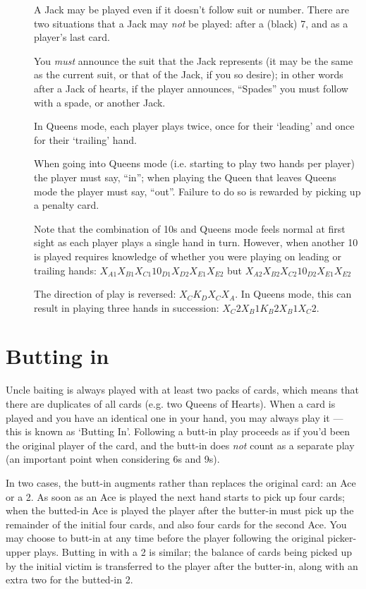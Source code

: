 \documentclass[12pt]{article}
\begin{document}
\begin{description}
  \item[]
    A Jack may be played even if it doesn't follow suit or number.  There are two situations
    that a Jack may \emph{not} be played:  after a (black) 7, and as a player's last card.

    You \emph{must} announce the suit that the Jack represents (it may be the same as the
    current suit, or that of the Jack, if you so desire);  in other words after a Jack of
    hearts, if the player announces, ``Spades'' you must follow with a spade, or another Jack.

  \item[]
    In Queens mode, each player plays twice, once for their `leading' and once for their
    `trailing' hand.

    When going into Queens mode (i.e. starting to play two hands per player) the player must say, ``in''; when playing
    the Queen that leaves Queens mode the player must say, ``out''.  Failure to do so is rewarded by picking up a
    penalty card.

    Note that the combination of 10s and Queens mode feels normal at first sight as each player plays a single hand in
    turn.  However, when another 10 is played requires knowledge of whether you were playing on leading or trailing
    hands: $X_{A1} X_{B1} X_{C1} 10_{D1} X_{D2} X_{E1} X_{E2}$ but $X_{A2} X_{B2} X_{C2} 10_{D2} X_{E1} X_{E2}$

  \item[]
    The direction of play is reversed: $X_C K_D X_C X_A$.  In Queens mode, this can result in playing
    three hands in succession: $X_C2 X_B1 K_B2 X_B1 X_C2$.

\end{description}

\section{Butting in}
\label{buttingIn}

Uncle baiting is always played with at least two packs of cards, which means that there
are duplicates of all cards (e.g. two Queens of Hearts).  When a card is played and you
have an identical one in your hand, you may always play it --- this is known as `Butting In'.
Following a butt-in play proceeds as if you'd been the original player of the card, and
the butt-in does \emph{not} count as a separate play (an important point when considering
6s and 9s).

In two cases, the butt-in augments rather than replaces the original card:
an Ace or a 2.  As soon as an Ace is played the next hand starts to pick up
four cards;  when the butted-in Ace is played the player after the butter-in
must pick up the remainder of the initial four cards, and also four cards for
the second Ace.  You may choose to butt-in at any time before the player following
the original picker-upper plays.   Butting in with a 2 is similar;  the balance
of cards being picked up by the initial victim is transferred to the player
after the butter-in, along with an extra two for the butted-in 2.
\end{document}
